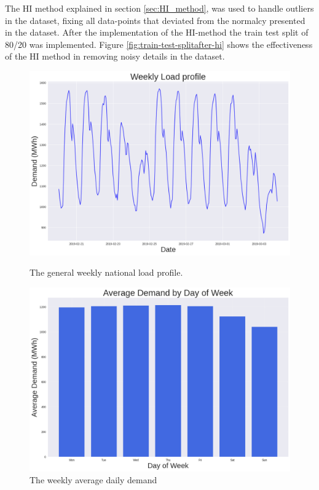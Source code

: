  The HI method explained in section \ref{sec:HI_method}, was used to handle outliers in the dataset, fixing all data-points that deviated from the normalcy presented in the dataset. After the implementation of the HI-method the train test split of 80/20 was implemented. Figure \ref{fig:train-test-splitafter-hi} shows the effectiveness of the HI method in removing noisy details in the dataset.

 \begin{figure}[h]
  	\centering
  	\begin{minipage}[b]{0.45\linewidth}
  		\centering
  		\includegraphics[width=\linewidth]{Chapters/images/results/weekly_load_profile.png}
  		\caption{The general weekly national load profile.}
  		\label{fig:weeklyloadprofile}
  	\end{minipage}
  	\hfill
  	\begin{minipage}[b]{0.45\linewidth}
  		\centering
  		\includegraphics[width=\linewidth]{Chapters/images/results/average_daily_demand.png}
  		\caption{The weekly average daily demand }
  		\label{fig:averagedailydemand}
  	\end{minipage}
  \end{figure}
  
